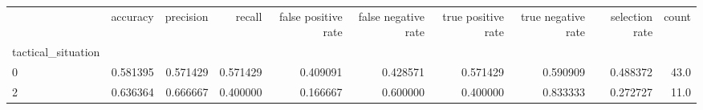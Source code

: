 \begin{tabular}{lrrrrrrrrr}
\toprule
{} &  accuracy &  precision &    recall &  false positive rate &  false negative rate &  true positive rate &  true negative rate &  selection rate &  count \\
tactical\_situation &           &            &           &                      &                      &                     &                     &                 &        \\
\midrule
0                  &  0.581395 &   0.571429 &  0.571429 &             0.409091 &             0.428571 &            0.571429 &            0.590909 &        0.488372 &   43.0 \\
2                  &  0.636364 &   0.666667 &  0.400000 &             0.166667 &             0.600000 &            0.400000 &            0.833333 &        0.272727 &   11.0 \\
\bottomrule
\end{tabular}
